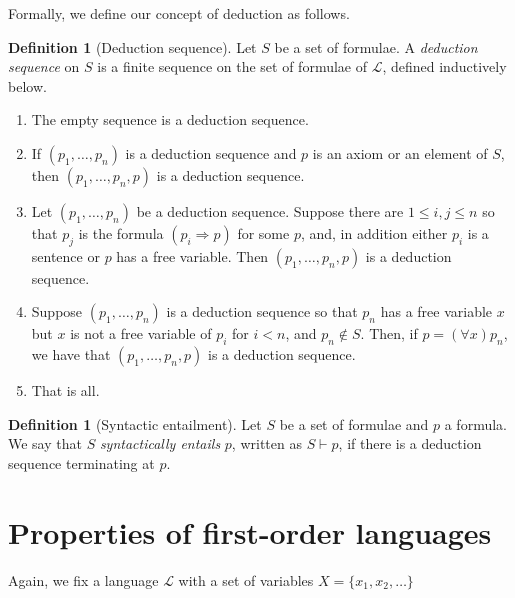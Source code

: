 \documentclass{report}
\theoremstyle{definition}
\theoremstyle{plain}
\theoremstyle{definition}
\newtheorem{defn}[thm]{Definition}
\begin{document}
	Formally, we define our concept of deduction as follows.
	\begin{defn}[Deduction sequence]
		Let $S$ be a set of formulae. A \emph{deduction sequence} on $S$ is a finite sequence on the set of formulae of $\mathcal{L}$, defined inductively below.
		\begin{enumerate}[label=(\roman*)]
			\item The empty sequence is a deduction sequence.
			\item If $(p_1,\ldots,p_n)$ is a deduction sequence and $p$ is an axiom or an element of $S$, then $(p_1,\ldots,p_n,p)$ is a deduction sequence.
			\item Let $(p_1,\ldots,p_n)$ be a deduction sequence. Suppose there are $1\leq i,j\leq n$ so that $p_j$ is the formula $(p_i\Rightarrow p)$ for some $p$, and, in addition either $p_i$ is a sentence or $p$ has a free variable. Then $(p_1,\ldots,p_n,p)$ is a deduction sequence.
			\item Suppose $(p_1,\ldots, p_n)$ is a deduction sequence so that $p_n$ has a free variable $x$ but $x$ is not a free variable of $p_i$ for $i<n$, and $p_n\notin S$. Then, if $p = (\forall x) p_n$, we have that  $(p_1,\ldots, p_n,p)$ is a deduction sequence.
			\item That is all.
		\end{enumerate}
	\end{defn}
	\begin{defn}[Syntactic entailment]
		Let $S$ be a set of formulae and $p$ a formula. We say that $S$ \emph{syntactically entails} $p$, written as $S\vdash p$, if there is a deduction sequence terminating at $p$.
	\end{defn}
	\section{Properties of first-order languages}
	Again, we fix a language $\mathcal{L}$ with a set of variables $X=\{x_1,x_2,\ldots\}$
\end{document}
